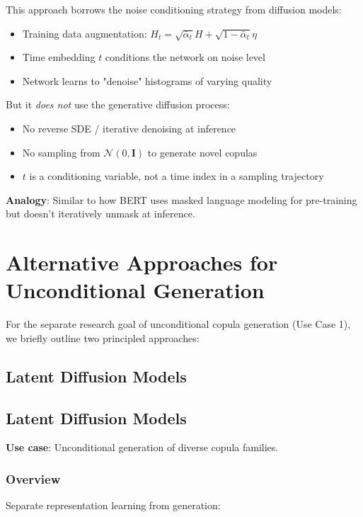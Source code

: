 \documentclass[11pt]{article}
\begin{document}
This approach borrows the noise conditioning strategy from diffusion models:
\begin{itemize}
    \item Training data augmentation: $H_t = \sqrt{\bar{\alpha}_t} H + \sqrt{1-\bar{\alpha}_t} \eta$
    \item Time embedding $t$ conditions the network on noise level
    \item Network learns to "denoise" histograms of varying quality
\end{itemize}

But it \emph{does not} use the generative diffusion process:
\begin{itemize}
    \item No reverse SDE / iterative denoising at inference
    \item No sampling from $\mathcal{N}(0, \mathbf{I})$ to generate novel copulas
    \item $t$ is a conditioning variable, not a time index in a sampling trajectory
\end{itemize}

\textbf{Analogy}: Similar to how BERT uses masked language modeling for pre-training but doesn't iteratively unmask at inference.

\section{Alternative Approaches for Unconditional Generation}

For the separate research goal of unconditional copula generation (Use Case 1), we briefly outline two principled approaches:

\subsection{Latent Diffusion Models}

\subsection{Latent Diffusion Models}

\textbf{Use case}: Unconditional generation of diverse copula families.

\subsubsection{Overview}

Separate representation learning from generation:
\end{document}
